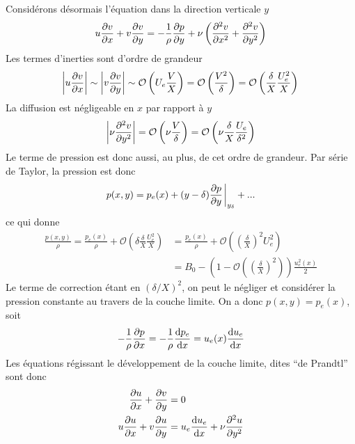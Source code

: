       Considérons désormais l'équation dans la direction verticale $y$
      \begin{equation}
        u\pdv{v}{x} + v \pdv{v}{y} = -\frac{1}{\rho}\pdv{p}{y} + \nu \left(\pdv[2]{v}{x} + \pdv[2]{v}{y}\right)
      \end{equation}
      Les termes d'inerties sont d'ordre de grandeur
      \begin{equation}
        \left|u \pdv{v}{x} \right| \sim \left|v\pdv{v}{y}\right| \sim \mathcal{O}\left(U_e \frac{V}{X} \right) =
        \mathcal{O}\left(\frac{V^2}{\delta}\right) = \mathcal{O}\left(\frac{\delta}{X}\frac{U_e^2}{X}\right)\\
      \end{equation}
      La diffusion est négligeable en $x$ par rapport à $y$
      \begin{equation}
        \left| \nu \pdv[2]{v}{y} \right| = \mathcal{O}\left(\nu \frac{V}{\delta}\right) = \mathcal{O}\left(\nu \frac{\delta}{X}\frac{U_e}{\delta^2}\right)
      \end{equation}
      Le terme de pression est donc aussi, au plus, de cet ordre de grandeur. Par série de Taylor, la pression est donc
      \begin{equation}
        p(x, y) = p_e(x) + (y-\delta) \pdv{p}{y}\eval_{y_\delta} + ...
      \end{equation}
      ce qui donne
      \begin{equation}
        \begin{aligned}
          \frac{p(x,y)}{\rho} = \frac{p_e(x)}{\rho} + \mathcal{O}\left(\delta \frac{\delta}{X}\frac{U_e^2}{X}\right) &= \frac{p_e(x)}{\rho} + \mathcal{O}\left(\left(\frac{\delta}{X}\right)^2 U_e^2\right)\\
          &= B_0 - \left(1 - \mathcal{O}\left(\left(\frac{\delta}{X}\right)^2\right)\right) \frac{u_e^2(x)}{2}
        \end{aligned}
      \end{equation}
      Le terme de correction étant en $(\delta/X)^2$, on peut le négliger et considérer la pression constante au travers de la couche limite. On a donc $p(x, y) = p_e(x)$, soit
      \begin{equation}
        -\frac{1}{\rho} \pdv{p}{x} = -\frac{1}{\rho}\dv{p_e}{x}(x) = u_e(x) \dv{u_e}{x}(x)
      \end{equation}
      Les équations régissant le développement de la couche limite, dites ``de Prandtl'' sont donc
      \begin{equation}
        \begin{aligned}
          \pdv{u}{x} + \pdv{v}{y} &= 0\\
          u \pdv{u}{x} + v \pdv{u}{y} &= u_e \dv{u_e}{x} + \nu \pdv[2]{u}{y}
        \end{aligned}
      \end{equation}

